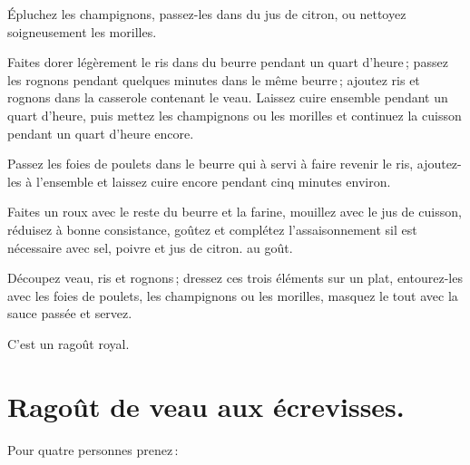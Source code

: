 Épluchez les champignons, passez-les dans du jus de citron, ou nettoyez
soigneusement les morilles.

Faites dorer légèrement le ris dans du beurre pendant un quart d'heure ; passez
les rognons pendant quelques minutes dans le même beurre ; ajoutez ris et
rognons dans la casserole contenant le veau. Laissez cuire ensemble pendant un
quart d'heure, puis mettez les champignons ou les morilles et continuez la cuisson
pendant un quart d'heure encore.

Passez les foies de poulets dans le beurre qui à servi à faire revenir le ris,
ajoutez-les à l'ensemble et laissez cuire encore pendant cinq minutes environ.

Faites un roux avec le reste du beurre et la farine, mouillez avec le jus de
cuisson, réduisez à bonne consistance, goûtez et complétez l'assaisonnement sil
est nécessaire avec sel, poivre et jus de citron. au goût.

Découpez veau, ris et rognons ; dressez ces trois éléments sur un plat,
entourez-les avec les foies de poulets, les champignons ou les morilles,
masquez le tout avec la sauce passée et servez.

C'est un ragoût royal.

\section*{\centering Ragoût de veau aux écrevisses.}
{}

Pour quatre personnes prenez :

\medskip

